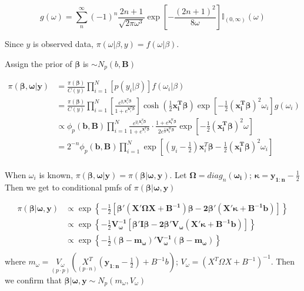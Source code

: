 \documentclass[12pt]{article}
\begin{document}
\[g(\omega)=\sum_n^\infty(-1)^n\frac{2n+1}{\sqrt{2\pi\omega^3}}\exp[-\frac{(2n+1)^2}{8\omega}]\mathbb{I}_{(0,\infty)}(\omega)\]

Since \(y\) is observed data, \(\pi(\omega|\beta,y)=f(\omega|\beta)\).

Assign the prior of \(\boldsymbol{\beta}\) is
\(\sim N_p(b,\boldsymbol{B})\)

\[\begin{aligned} 
\pi(\boldsymbol{\beta,\omega|y})&= \frac{\pi(\boldsymbol{\beta})}{C(y)}\prod_{i=1}^{N}[p(y_i|\beta)]f(\omega_i|\beta)\\
&= \frac{\pi(\boldsymbol{\beta})}{C(y)}\prod_{i=1}^{N}\left[\frac{e^{y_i\mathbf{x}_i^T\boldsymbol{\beta}}}{1+e^{\mathbf{x}_i^T\boldsymbol{\beta}}}\right]\cosh{(\frac12\boldsymbol{x_i^T\beta})}\exp\left[-\frac12(\boldsymbol{x_i^T\beta})^2\omega_i\right]g(\omega_i)\\
&\propto\phi_p(\mathbf{b,B})\prod_{i=1}^{N}\frac{e^{y_i\mathbf{x}_i^T\boldsymbol{\beta}}}{1+e^{\mathbf{x}_i^T\boldsymbol{\beta}}}\cdot\frac{1+e^{\boldsymbol{x_i^T\beta}}}{2e^{\frac12\boldsymbol{x_i^T\beta}}}\exp\left[-\frac12(\boldsymbol{x_i^T\beta})^2\omega\right]\\
&=2^{-n}\phi_p(\mathbf{b,B})\prod_{i=1}^{N}\exp\left[(y_i-\frac12)\mathbf{x}_i^T\boldsymbol{\beta}-\frac12(\boldsymbol{x_i^T\beta})^2\omega_i\right]\\
\end{aligned}\]

When \(\omega_i\) is known,
\(\pi(\boldsymbol{\beta,\omega|y})=\pi(\boldsymbol{\beta|\omega,y})\).
Let \(\boldsymbol{\Omega}=diag_n(\mathbf{\omega_i})\);
\(\boldsymbol{\kappa}=\mathbf{y_{1:n}}-\frac12\) Then we get to
conditional pmfs of \(\pi(\boldsymbol{\beta|\omega,y})\)

\[\begin{aligned} 
\pi(\boldsymbol{\beta|\omega,y})&\propto\exp\left\{-\frac12\left[\boldsymbol{\beta'(X'\Omega X+B^{-1})\beta-2\beta'(X'\kappa+B^{-1}b)}\right]\right\}\\
&\propto\exp\left\{-\frac12\boldsymbol{V_\omega^{-1}[\beta'I\beta-2\beta'V_\omega(X'\kappa+B^{-1}b)]}\right\}\\
&\propto\exp\left\{-\frac12\boldsymbol{(\beta-m_\omega)'V_\omega^{-1}(\beta-m_\omega)}\right\}\\
\end{aligned}\] where
\(m_\omega=\underset{(p\cdot p)}{V_\omega}(\underset{(p\cdot n)}{X^T}(\mathbf{y_{1:n}}-\frac12)+B^{-1}b)\);
\(V_\omega=(X^T\Omega X+B^{-1})^{-1}\). Then we confirm that
\(\boldsymbol{\beta|\omega,y}\sim N_p(m_\omega,V_\omega)\)
\end{document}
